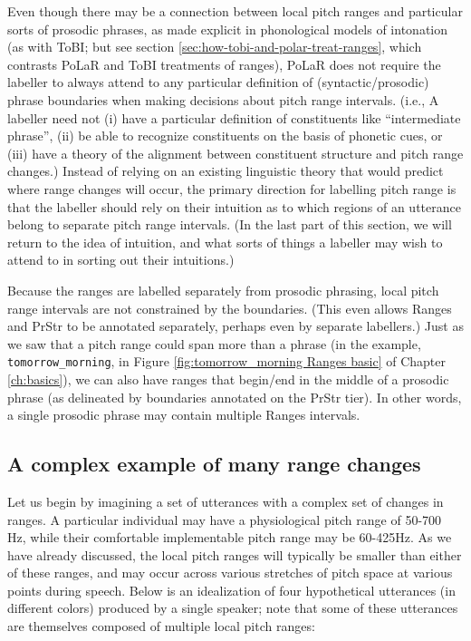 Even though there may be a connection between local pitch ranges and particular sorts of prosodic phrases, as made explicit in phonological models of intonation (as with ToBI; but see section \ref{sec:how-tobi-and-polar-treat-ranges}, which contrasts PoLaR and ToBI treatments of ranges), PoLaR does not require the labeller to always attend to any particular definition of (syntactic\slash prosodic) phrase boundaries when making decisions about pitch range intervals. (i.e., A labeller need not (i) have a particular definition of constituents like “intermediate phrase”, (ii) be able to recognize constituents on the basis of phonetic cues, or (iii) have a theory of the alignment between constituent structure and pitch range changes.) Instead of relying on an existing linguistic theory that would predict where range changes will occur, the primary direction for labelling pitch range is that the labeller should rely on their intuition as to which regions of an utterance belong to separate pitch range intervals. (In the last part of this section, we will return to the idea of intuition, and what sorts of things a labeller may wish to attend to in sorting out their intuitions.)

Because the ranges are labelled separately from prosodic phrasing, local pitch range intervals are not constrained by the boundaries. (This even allows Ranges and PrStr to be annotated separately, perhaps even by separate labellers.) Just as we saw that a pitch range could span more than a phrase (in the example, \texttt{tomorrow\_morning}, in Figure \ref{fig:tomorrow_morning Ranges basic} of Chapter \ref{ch:basics}), we can also have ranges that begin\slash end in the middle of a prosodic phrase (as delineated by boundaries annotated on the PrStr tier). In other words, a single prosodic phrase may contain multiple Ranges intervals.

\subsection{A complex example of many range changes}\label{sec:a-complex-example-of-many-range-changes}

Let us begin by imagining a set of utterances with a complex set of changes in ranges. A particular individual may have a physiological pitch range of 50-700 Hz, while their comfortable implementable pitch range may be 60-425Hz. As we have already discussed, the local pitch ranges will typically be smaller than either of these ranges, and may occur across various stretches of pitch space at various points during speech. Below is an idealization of four hypothetical utterances (in different colors) produced by a single speaker; note that some of these utterances are themselves composed of multiple local pitch ranges:

